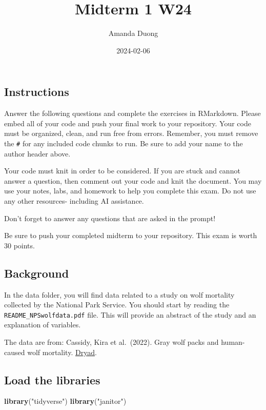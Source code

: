 \documentclass[
]{article}
\title{Midterm 1 W24}
\author{Amanda Duong}
\date{2024-02-06}
\newenvironment{Shaded}{\begin{snugshade}}{\end{snugshade}}
\newcommand{\FunctionTok}[1]{\textcolor[rgb]{0.13,0.29,0.53}{\textbf{#1}}}
\newcommand{\NormalTok}[1]{#1}
\newcommand{\StringTok}[1]{\textcolor[rgb]{0.31,0.60,0.02}{#1}}
\begin{document}
\maketitle

\hypertarget{instructions}{%
\subsection{Instructions}\label{instructions}}

Answer the following questions and complete the exercises in RMarkdown.
Please embed all of your code and push your final work to your
repository. Your code must be organized, clean, and run free from
errors. Remember, you must remove the \texttt{\#} for any included code
chunks to run. Be sure to add your name to the author header above.

Your code must knit in order to be considered. If you are stuck and
cannot answer a question, then comment out your code and knit the
document. You may use your notes, labs, and homework to help you
complete this exam. Do not use any other resources- including AI
assistance.

Don't forget to answer any questions that are asked in the prompt!

Be sure to push your completed midterm to your repository. This exam is
worth 30 points.

\hypertarget{background}{%
\subsection{Background}\label{background}}

In the data folder, you will find data related to a study on wolf
mortality collected by the National Park Service. You should start by
reading the \texttt{README\_NPSwolfdata.pdf} file. This will provide an
abstract of the study and an explanation of variables.

The data are from: Cassidy, Kira et al.~(2022). Gray wolf packs and
human-caused wolf mortality.
\href{https://doi.org/10.5061/dryad.mkkwh713f}{Dryad}.

\hypertarget{load-the-libraries}{%
\subsection{Load the libraries}\label{load-the-libraries}}

\begin{Shaded}
\begin{Highlighting}[]
\FunctionTok{library}\NormalTok{(}\StringTok{"tidyverse"}\NormalTok{)}
\FunctionTok{library}\NormalTok{(}\StringTok{"janitor"}\NormalTok{)}
\end{Highlighting}
\end{Shaded}
\end{document}
